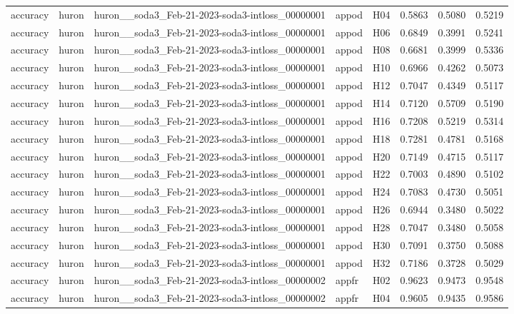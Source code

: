 \begin{table}[tbp]
\begin{tabular}{lllllrrr}
accuracy & huron & huron\_\_soda3\_Feb-21-2023-soda3-intloss\_00000001 & appod & H04 & 0.5863 & 0.5080 & 0.5219 \\
accuracy & huron & huron\_\_soda3\_Feb-21-2023-soda3-intloss\_00000001 & appod & H06 & 0.6849 & 0.3991 & 0.5241 \\
accuracy & huron & huron\_\_soda3\_Feb-21-2023-soda3-intloss\_00000001 & appod & H08 & 0.6681 & 0.3999 & 0.5336 \\
accuracy & huron & huron\_\_soda3\_Feb-21-2023-soda3-intloss\_00000001 & appod & H10 & 0.6966 & 0.4262 & 0.5073 \\
accuracy & huron & huron\_\_soda3\_Feb-21-2023-soda3-intloss\_00000001 & appod & H12 & 0.7047 & 0.4349 & 0.5117 \\
accuracy & huron & huron\_\_soda3\_Feb-21-2023-soda3-intloss\_00000001 & appod & H14 & 0.7120 & 0.5709 & 0.5190 \\
accuracy & huron & huron\_\_soda3\_Feb-21-2023-soda3-intloss\_00000001 & appod & H16 & 0.7208 & 0.5219 & 0.5314 \\
accuracy & huron & huron\_\_soda3\_Feb-21-2023-soda3-intloss\_00000001 & appod & H18 & 0.7281 & 0.4781 & 0.5168 \\
accuracy & huron & huron\_\_soda3\_Feb-21-2023-soda3-intloss\_00000001 & appod & H20 & 0.7149 & 0.4715 & 0.5117 \\
accuracy & huron & huron\_\_soda3\_Feb-21-2023-soda3-intloss\_00000001 & appod & H22 & 0.7003 & 0.4890 & 0.5102 \\
accuracy & huron & huron\_\_soda3\_Feb-21-2023-soda3-intloss\_00000001 & appod & H24 & 0.7083 & 0.4730 & 0.5051 \\
accuracy & huron & huron\_\_soda3\_Feb-21-2023-soda3-intloss\_00000001 & appod & H26 & 0.6944 & 0.3480 & 0.5022 \\
accuracy & huron & huron\_\_soda3\_Feb-21-2023-soda3-intloss\_00000001 & appod & H28 & 0.7047 & 0.3480 & 0.5058 \\
accuracy & huron & huron\_\_soda3\_Feb-21-2023-soda3-intloss\_00000001 & appod & H30 & 0.7091 & 0.3750 & 0.5088 \\
accuracy & huron & huron\_\_soda3\_Feb-21-2023-soda3-intloss\_00000001 & appod & H32 & 0.7186 & 0.3728 & 0.5029 \\
accuracy & huron & huron\_\_soda3\_Feb-21-2023-soda3-intloss\_00000002 & appfr & H02 & 0.9623 & 0.9473 & 0.9548 \\
accuracy & huron & huron\_\_soda3\_Feb-21-2023-soda3-intloss\_00000002 & appfr & H04 & 0.9605 & 0.9435 & 0.9586 \\

\end{tabular}
\end{table}
